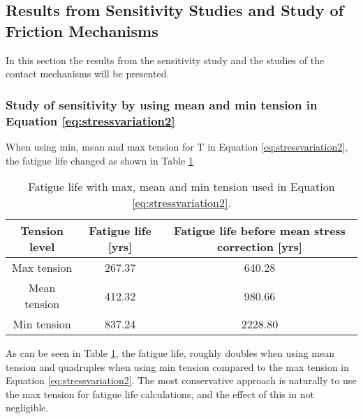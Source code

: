 \subsection{Results from Sensitivity Studies and Study of Friction Mechanisms}
In this section the results from the sensitivity study and the studies of the contact mechanisms will be presented. 
\subsubsection{Study of sensitivity by using mean and min tension in Equation \ref{eq:stressvariation2}}
When using min, mean and max tension for T in Equation \ref{eq:stressvariation2}, the fatigue life changed as shown in Table \ref{table:maxmin}

\begin{table} [H]
\centering
\begin{tabular}{ |c|c|c|}
\hline
Tension level & Fatigue life [yrs] & Fatigue life before mean stress correction [yrs]\\ 
 \hline
 \hline
	Max tension & 267.37 & 640.28 \\ 
	Mean tension & 412.32 & 980.66 \\ 
	Min tension & 837.24 & 2228.80 \\ 
	\hline
\end{tabular}
\caption{Fatigue life with max, mean and min tension used in Equation \ref{eq:stressvariation2}.}
\label{table:maxmin}
\end{table} 
As can be seen in Table \ref{table:maxmin}, the fatigue life, roughly doubles when using mean tension and quadruples when using min tension compared to the max tension in Equation \ref{eq:stressvariation2}. The most conservative approach is naturally to use the max tension for fatigue life calculations, and the effect of this in not negligible. 

